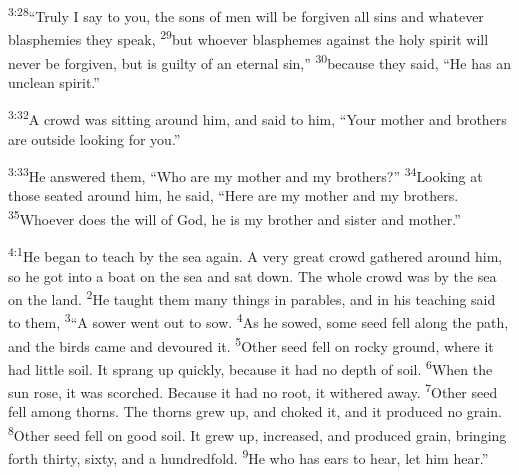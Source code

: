 \documentclass[openany,12pt,english]{book}
\newenvironment{para}{\par\pretolerance=100\tolerance=200\setlength{\emergencystretch}{0.6em}\relax}{\par}
\begin{document}
\begin{para}
    \textsuperscript{3:28}\thinspace{}“Tru\-ly I say to you, the sons of men will be for\-giv\-en all sins and what\-ev\-er blasphemies they speak,
    \textsuperscript{29}\thinspace{}but who\-ev\-er blasphemes a\-gainst the ho\-ly spir\-it will nev\-er be for\-giv\-en, but is guilt\-y of an e\-ter\-nal sin,”
    \textsuperscript{30}\thinspace{}be\-cause they said, “He has an un\-clean spir\-it.”
\end{para}

\bigskip{}

\begin{para}
    \textsuperscript{3:32}\thinspace{}A crowd was sit\-ting a\-round him, and said to him, “Your moth\-er and brothers are out\-side looking for you.”
\end{para}

\begin{para}
    \textsuperscript{3:33}\thinspace{}He answered them, “Who are my moth\-er and my brothers?”
    \textsuperscript{34}\thinspace{}Looking at those seated a\-round him, he said, “Here are my moth\-er and my brothers.
    \textsuperscript{35}\thinspace{}Who\-ev\-er does the will of God, he is my broth\-er and sis\-ter and moth\-er.”
\end{para}

\bigskip{}

\begin{para}
    \textsuperscript{4:1}\thinspace{}He be\-gan to teach by the sea a\-gain. A ver\-y great crowd gathered a\-round him, so he got in\-to a boat on the sea and sat down. The whole crowd was by the sea on the land.
    \textsuperscript{2}\thinspace{}He taught them man\-y things in parables, and in his teach\-ing said to them,
    \textsuperscript{3}\thinspace{}“A sower went out to sow.
    \textsuperscript{4}\thinspace{}As he sowed, some seed fell a\-long the path, and the birds came and devoured it.
    \textsuperscript{5}\thinspace{}Oth\-er seed fell on rock\-y ground, where it had lit\-tle soil. It sprang up quick\-ly, be\-cause it had no depth of soil.
    \textsuperscript{6}\thinspace{}When the sun rose, it was scorched. Be\-cause it had no root, it withered a\-way.
    \textsuperscript{7}\thinspace{}Oth\-er seed fell a\-mong thorns. The thorns grew up, and choked it, and it pro\-duced no grain.
    \textsuperscript{8}\thinspace{}Oth\-er seed fell on good soil. It grew up, in\-creased, and pro\-duced grain, bring\-ing forth thir\-ty, six\-ty, and a hun\-dred\-fold.
    \textsuperscript{9}\thinspace{}He who has ears to hear, let him hear.”
\end{para}
\end{document}
